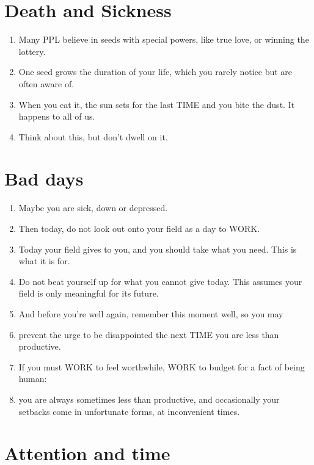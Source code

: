 \documentclass[
]{book}
\providecommand{\tightlist}{%
  \setlength{\itemsep}{0pt}\setlength{\parskip}{0pt}}
\begin{document}
\hypertarget{death-and-sickness}{%
\section{Death and Sickness}\label{death-and-sickness}}

\begin{enumerate}
\def\labelenumi{\arabic{enumi}.}
\setcounter{enumi}{18}
\tightlist
\item
  Many PPL believe in seeds with special powers, like true love, or winning the
  lottery.
\item
  One seed grows the duration of your life, which you rarely notice but are often
  aware of.
\item
  When you eat it, the sun sets for the last TIME and you bite the dust. It happens
  to all of us.
\item
  Think about this, but don't dwell on it.
\end{enumerate}

\hypertarget{bad-days}{%
\section{Bad days}\label{bad-days}}

\begin{enumerate}
\def\labelenumi{\arabic{enumi}.}
\setcounter{enumi}{22}
\tightlist
\item
  Maybe you are sick, down or depressed.
\item
  Then today, do not look out onto your field as a day to WORK.
\item
  Today your field gives to you, and you should take what you need. This is what it
  is for.
\item
  Do not beat yourself up for what you cannot give today. This assumes your field
  is only meaningful for its future.
\item
  And before you're well again, remember this moment well, so you may
\item
  prevent the urge to be disappointed the next TIME you are less than productive.
\item
  If you must WORK to feel worthwhile, WORK to budget for a fact of being
  human:
\item
  you are always sometimes less than productive, and occasionally your setbacks
  come in unfortunate forms, at inconvenient times.
\end{enumerate}

\hypertarget{attention-and-time}{%
\section{Attention and time}\label{attention-and-time}}
\end{document}
